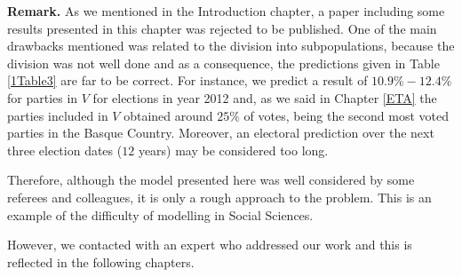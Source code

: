 \textbf{Remark.} As we mentioned in the Introduction chapter, a paper including some results presented in this chapter was rejected to be published. One of the main drawbacks mentioned was related to the division into subpopulations, because the division was not well done and as a consequence, the predictions given in Table \ref{1Table3} are far to be correct. For instance, we predict a result of $10.9\% - 12.4\%$ for parties in $V$ for elections in year 2012 and, as we said in Chapter \ref{ETA} the parties included in $V$ obtained around $25\%$ of votes, being the second most voted parties in the Basque Country. Moreover, an electoral prediction over the next three election dates ($12$ years) may be considered too long. 

Therefore, although the model presented here was well considered by some referees and colleagues, it is only a rough approach to the problem. This is an example of the difficulty of modelling in Social Sciences.

However, we contacted with an expert who addressed our work and this is reflected in the following chapters.
